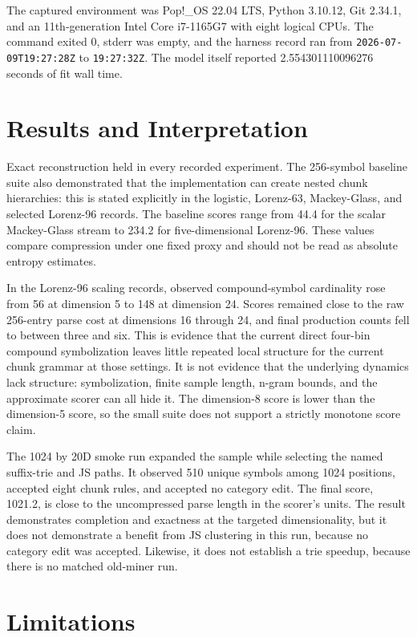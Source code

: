\documentclass[11pt]{article}
\begin{document}
The captured environment was Pop!\_OS 22.04 LTS, Python 3.10.12, Git 2.34.1,
and an 11th-generation Intel Core i7-1165G7 with eight logical CPUs. The command
exited 0, stderr was empty, and the harness record ran from
\texttt{2026-07-09T19:27:28Z} to \texttt{19:27:32Z}. The model itself reported
2.554301110096276 seconds of fit wall time.

\section{Results and Interpretation}

Exact reconstruction held in every recorded experiment. The 256-symbol
baseline suite also demonstrated that the implementation can create nested
chunk hierarchies: this is stated explicitly in the logistic, Lorenz-63,
Mackey-Glass, and selected Lorenz-96 records. The baseline scores range from
44.4 for the scalar Mackey-Glass stream to 234.2 for five-dimensional
Lorenz-96. These values compare compression under one fixed proxy and should
not be read as absolute entropy estimates.

In the Lorenz-96 scaling records, observed compound-symbol cardinality rose from
56 at dimension 5 to 148 at dimension 24. Scores remained close to the raw
256-entry parse cost at dimensions 16 through 24, and final production counts
fell to between three and six. This is evidence that the current direct
four-bin compound symbolization leaves little repeated local structure for the
current chunk grammar at those settings. It is not evidence that the underlying
dynamics lack structure: symbolization, finite sample length, n-gram bounds, and
the approximate scorer can all hide it. The dimension-8 score is lower than the
dimension-5 score, so the small suite does not support a strictly monotone score
claim.

The 1024 by 20D smoke run expanded the sample while selecting the named
suffix-trie and JS paths. It observed 510 unique symbols among 1024 positions,
accepted eight chunk rules, and accepted no category edit. The final score,
1021.2, is close to the uncompressed parse length in the scorer's units. The
result demonstrates completion and exactness at the targeted dimensionality,
but it does not demonstrate a benefit from JS clustering in this run, because
no category edit was accepted. Likewise, it does not establish a trie speedup,
because there is no matched old-miner run.

\section{Limitations}
\end{document}
